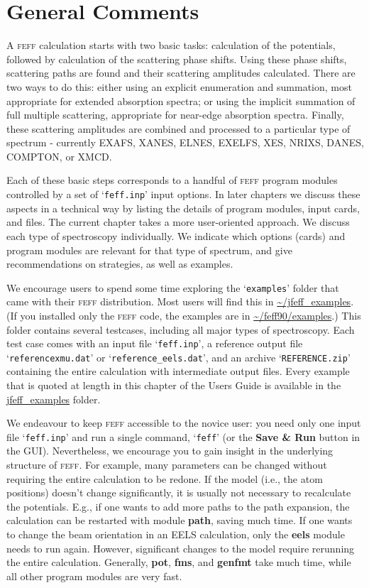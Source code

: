 \documentclass[11pt,oneside]{report} %
\newcommand{\program}[1]{\textsc{#1}}
\newcommand{\feff}{\program{feff}}
\newcommand{\file}[1]{`\texttt{#1}'}
\newcommand{\module}[1]{\textrm{\bf{#1}}}
\begin{document}
\section{General Comments}

A {\feff} calculation starts with two basic tasks: calculation of the potentials, followed by calculation of the scattering phase shifts.  Using these phase shifts, scattering paths are found and their scattering amplitudes calculated.  There are two ways to do this: either using an explicit enumeration and summation, most appropriate for extended absorption spectra; or using the implicit summation of full multiple scattering, appropriate for near-edge absorption spectra.  Finally, these scattering amplitudes are combined and processed to a particular type of spectrum - currently EXAFS, XANES, ELNES, EXELFS, XES, NRIXS, DANES, COMPTON, or XMCD.

Each of these basic steps corresponds to a handful of {\feff} program modules controlled by a set of \file{feff.inp} input options.  In later chapters we discuss these aspects in a technical way by listing the details of program modules, input cards, and files.  The current chapter takes a more user-oriented approach.  We discuss each type of spectroscopy individually.  We indicate which options (cards) and program modules are relevant for that type of spectrum, and give recommendations on strategies, as well as examples.

We encourage users to spend some time exploring the \file{examples} folder that came with their {\feff} distribution.  Most users will find this in \url{\~/jfeff_examples}.  (If you installed only the {\feff} code, the examples are in \url{\~/feff90/examples}.)  This folder contains several testcases, including all major types of spectroscopy.  Each test case comes with an input file \file{feff.inp}, a reference output file \file{referencexmu.dat} or \file{reference\_eels.dat}, and an archive \file{REFERENCE.zip} containing the entire calculation with intermediate output files.  Every example that is quoted at length in this chapter of the Users Guide is available in the \url{jfeff_examples} folder.

We endeavour to keep {\feff} accessible to the novice user: you need only one input file \file{feff.inp} and run a single command, \file{feff} (or the \textbf{Save \& Run} button in the GUI).  Nevertheless, we encourage you to gain insight in the underlying structure of {\feff}.  For example, many parameters can be changed without requiring the entire calculation to be redone.  If the model (i.e., the atom positions) doesn't change significantly, it is usually not necessary to recalculate the potentials.  E.g., if one wants to add more paths to the path expansion, the calculation can be restarted with module \module{path}, saving much time.  If one wants to change the beam orientation in an EELS calculation, only the \module{eels} module needs to run again.  However, significant changes to the model require rerunning the entire calculation.  Generally, \module{pot}, \module{fms}, and \module{genfmt} take much time, while all other program modules are very fast.
\end{document}

